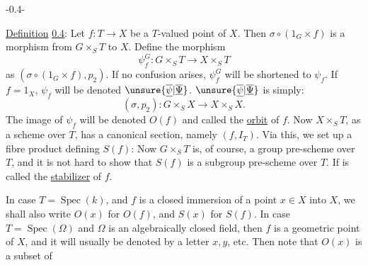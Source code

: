 \begin{center}-0.4-\end{center}
\uline{Definition} \uline{0.4}: Let $f:T\longrightarrow X$ be a $T$-valued point of $X$. Then $\sigma\circ(1_G\times f)$ is a morphism from $G\times_S T$ to $X$. Define the morphism
\[
\psi_f^G:G\times_S T\longrightarrow X\times_S T
\]
as $(\sigma\circ(1_G\times f),p_2)$. If no confusion arises, $\psi_f^G$ will be shortened to $\psi_f$. If $f=1_X$, $\psi_f$ will be denoted $\unsure{\overline{\underline{\psi}}|\overline{\underline{\Psi}}}$. $\unsure{\overline{\underline{\psi}}|\overline{\underline{\Psi}}}$ is simply:
\[
(\sigma,p_2):G\times_S X\longrightarrow X\times_S X.
\]
The image of $\psi_f$ will be denoted $O(f)$ and called the \uline{orbit} of $f$. Now $X\times_S T$, as a scheme over $T$, has a canonical section, namely $(f,I_T)$. Via this, we set up a fibre product defining $S(f)$:
Now $G\times_S T$ is, of course, a group pre-scheme over $T$, and it is not hard to show that $S(f)$ is a subgroup pre-scheme over $T$. If is called the \uline{stabilizer} of $f$.

In case $T=\operatorname{Spec}(k)$, and $f$ is a closed immersion of a point $x\in X$ into $X$, we shall also write $O(x)$ for $O(f)$, and $S(x)$ for $S(f)$. In case $T=\operatorname{Spec}(\Omega)$ and $\Omega$ is an algebraically closed field, then $f$ is a geometric point of $X$, and it will usually be denoted by a letter $x,y$, etc. Then note that $O(x)$ is a subset of
